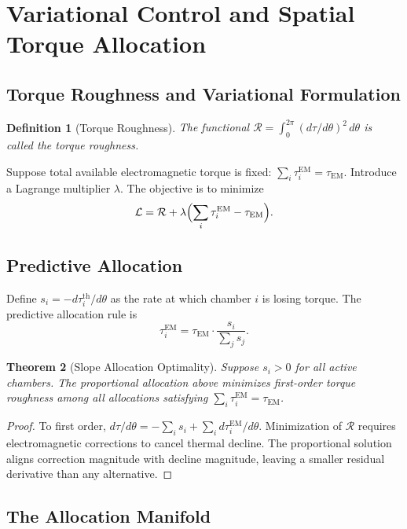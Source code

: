 \documentclass[12pt,a4paper]{article}
\newtheorem{theorem}{Theorem}[section]
\newtheorem{definition}[theorem]{Definition}
\begin{document}
\section{Variational Control and Spatial Torque Allocation}

\subsection{Torque Roughness and Variational Formulation}

\begin{definition}[Torque Roughness]
The functional $\mathcal{R} = \int_0^{2\pi} (d\tau/d\theta)^2\, d\theta$ is called the \emph{torque roughness}.
\end{definition}

Suppose total available electromagnetic torque is fixed: $\sum_i \tau_i^{\mathrm{EM}} = \tau_{\mathrm{EM}}$. Introduce a Lagrange multiplier $\lambda$. The objective is to minimize
\[
\mathcal{L} = \mathcal{R} + \lambda\Bigl(\sum_i \tau_i^{\mathrm{EM}} - \tau_{\mathrm{EM}}\Bigr).
\]

\subsection{Predictive Allocation}

Define $s_i = -d\tau_i^{\mathrm{th}}/d\theta$ as the rate at which chamber $i$ is losing torque. The predictive allocation rule is
\[
\tau_i^{\mathrm{EM}} = \tau_{\mathrm{EM}} \cdot \frac{s_i}{\sum_j s_j}.
\]

\begin{theorem}[Slope Allocation Optimality]
Suppose $s_i > 0$ for all active chambers. The proportional allocation above minimizes first-order torque roughness among all allocations satisfying $\sum_i \tau_i^{\mathrm{EM}} = \tau_{\mathrm{EM}}$.
\end{theorem}

\begin{proof}
To first order, $d\tau/d\theta = -\sum_i s_i + \sum_i d\tau_i^{\mathrm{EM}}/d\theta$. Minimization of $\mathcal{R}$ requires electromagnetic corrections to cancel thermal decline. The proportional solution aligns correction magnitude with decline magnitude, leaving a smaller residual derivative than any alternative.
\end{proof}

\subsection{The Allocation Manifold}
\end{document}
